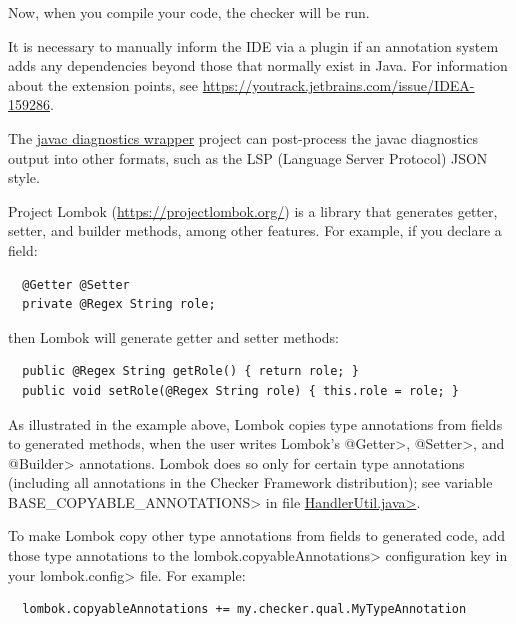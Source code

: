 Now, when you compile your code, the checker will be run.

It is necessary to manually inform the IDE via a plugin if an annotation
system adds any dependencies beyond those that normally exist in Java.
For information about the extension points, see
\url{https://youtrack.jetbrains.com/issue/IDEA-159286}.



The \href{https://github.com/eisopux/javac-diagnostics-wrapper}{javac
diagnostics wrapper} project can post-process the javac
diagnostics output into other formats, such as
the LSP (Language Server Protocol) JSON style.



Project Lombok (\url{https://projectlombok.org/}) is a library that
generates getter, setter, and builder methods, among other features.
For example, if you declare
a field:

\begin{Verbatim}
  @Getter @Setter
  private @Regex String role;
\end{Verbatim}

\noindent
then Lombok will generate getter and setter methods:

\begin{Verbatim}
  public @Regex String getRole() { return role; }
  public void setRole(@Regex String role) { this.role = role; }
\end{Verbatim}



As illustrated in the example above, Lombok copies type annotations from fields
to generated methods, when the user writes Lombok's \<@Getter>, \<@Setter>,
and \<@Builder> annotations.  Lombok does so only for certain type
annotations (including all annotations in the Checker Framework
distribution); see variable \<BASE\_COPYABLE\_ANNOTATIONS> in file
\href{https://github.com/rzwitserloot/lombok/blob/master/src/core/lombok/core/handlers/HandlerUtil.java}{\<HandlerUtil.java>}.

To make Lombok copy other type annotations from fields to generated code,
add those type annotations to the \<lombok.copyableAnnotations>
configuration key in your \<lombok.config> file.  For example:

\begin{Verbatim}
  lombok.copyableAnnotations += my.checker.qual.MyTypeAnnotation
\end{Verbatim}

